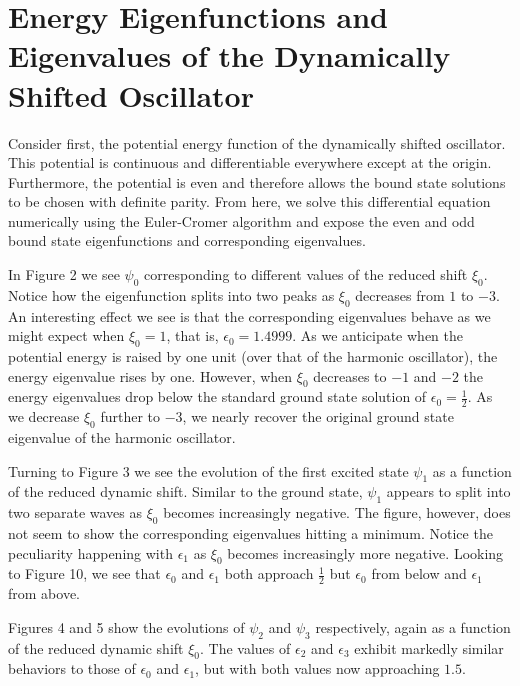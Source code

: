 \documentclass[12pt]{article}
\begin{document}
\section{Energy Eigenfunctions and Eigenvalues of the Dynamically Shifted Oscillator}
Consider first, the potential energy function of the dynamically shifted oscillator. This potential is continuous and differentiable everywhere except at the origin. Furthermore, the potential is even and therefore allows the bound state solutions to be chosen with definite parity. From here, we solve this differential equation numerically using the Euler-Cromer algorithm \cite{Gould-Tobochnik} and expose the even and odd bound state eigenfunctions and corresponding eigenvalues.

\par In Figure 2 we see $\psi_0$ corresponding to different values of the reduced shift $\xi_0$. Notice how the eigenfunction splits into two peaks as $\xi_0$ decreases from $1$ to $-3$. An interesting effect we see is that the corresponding eigenvalues behave as we might expect when $\xi_0=1$, that is, $\epsilon_0=1.4999$. As we anticipate when the potential energy is raised by one unit (over that of the harmonic oscillator), the energy eigenvalue rises by one. However, when $\xi_0$ decreases to $-1$ and $-2$ the energy eigenvalues drop below the standard ground state solution of $\epsilon_0=\frac{1}{2}$. As we decrease $\xi_0$ further to $-3$, we nearly recover the original ground state eigenvalue of the harmonic oscillator.

\par Turning to Figure 3 we see the evolution of the first excited state $\psi_1$ as a function of the reduced dynamic shift. Similar to the ground state, $\psi_1$ appears to split into two separate waves as $\xi_0$ becomes increasingly negative. The figure, however, does not seem to show the corresponding eigenvalues hitting a minimum. Notice the peculiarity happening with $\epsilon_1$ as $\xi_0$ becomes increasingly more negative. Looking to Figure 10, we see that $\epsilon_0$ and $\epsilon_1$ both approach $\frac{1}{2}$ but $\epsilon_0$ from below and $\epsilon_1$ from above.

\par Figures 4 and 5 show the evolutions of $\psi_2$ and $\psi_3$ respectively, again as a function of the reduced dynamic shift $\xi_0$. The values of $\epsilon_2$ and $\epsilon_3$ exhibit markedly similar behaviors to those of  $\epsilon_0$ and $\epsilon_1$, but with both values now approaching $1.5$.
\end{document}
